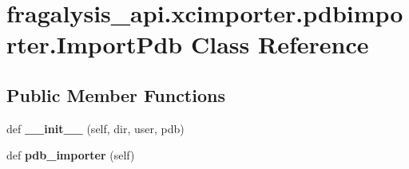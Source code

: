 \hypertarget{classfragalysis__api_1_1xcimporter_1_1pdbimporter_1_1_import_pdb}{}\section{fragalysis\+\_\+api.\+xcimporter.\+pdbimporter.\+Import\+Pdb Class Reference}
\label{classfragalysis__api_1_1xcimporter_1_1pdbimporter_1_1_import_pdb}
\subsection*{Public Member Functions}
\begin{DoxyCompactItemize}
\item 
\mbox{\label{classfragalysis__api_1_1xcimporter_1_1pdbimporter_1_1_import_pdb_adce98d493e0b72a1c383d26a4a84590f}} 
def {\bfseries \+\_\+\+\_\+init\+\_\+\+\_\+} (self, dir, user, pdb)
\item 
\mbox{\label{classfragalysis__api_1_1xcimporter_1_1pdbimporter_1_1_import_pdb_acd432818f58309c5a65c92db9ca08ada}} 
def {\bfseries pdb\+\_\+importer} (self)
\end{DoxyCompactItemize}
